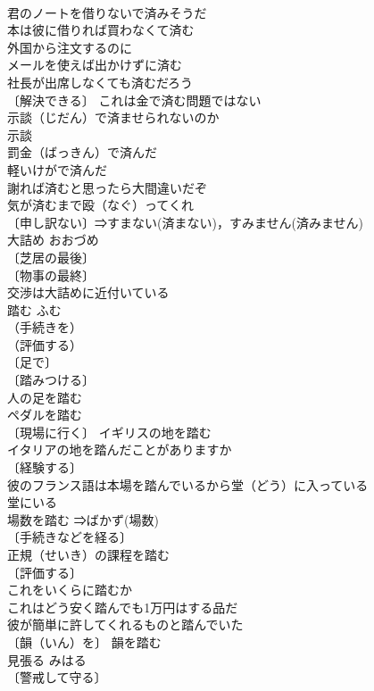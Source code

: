\documentclass[8pt]{extreport}
\begin{document}
\begin{CJK}{UTF8}{min}
\\	君のノートを借りないで済みそうだ 
\\	本は彼に借りれば買わなくて済む 
\\	外国から注文するのに
\\	メールを使えば出かけずに済む 
\\	社長が出席しなくても済むだろう 
\\	〔解決できる〕 これは金で済む問題ではない 
\\	示談（じだん）で済ませられないのか 
\\	示談　
\\	罰金（ばっきん）で済んだ 
\\	軽いけがで済んだ 
\\	謝れば済むと思ったら大間違いだぞ 
\\	気が済むまで殴（なぐ）ってくれ 
\\	〔申し訳ない〕⇒すまない(済まない)，すみません(済みません)
\\	大詰め	おおづめ	
\\	〔芝居の最後〕
\\	〔物事の最終〕
\\	交渉は大詰めに近付いている 
\\	踏む	ふむ	
\\	（手続きを）
\\	（評価する）
\\	〔足で〕
\\	〔踏みつける〕
\\	人の足を踏む 
\\	ペダルを踏む 
\\	〔現場に行く〕 イギリスの地を踏む 
\\	イタリアの地を踏んだことがありますか 
\\	〔経験する〕
\\	彼のフランス語は本場を踏んでいるから堂（どう）に入っている 
\\	堂にいる　
\\	場数を踏む ⇒ばかず(場数) 
\\	〔手続きなどを経る〕
\\	正規（せいき）の課程を踏む 
\\	〔評価する〕
\\	これをいくらに踏むか 
\\	これはどう安く踏んでも1万円はする品だ 
\\	彼が簡単に許してくれるものと踏んでいた 
\\	〔韻（いん）を〕 韻を踏む 
\\	見張る	みはる	
\\	〔警戒して守る〕

\end{CJK}
\end{document}
